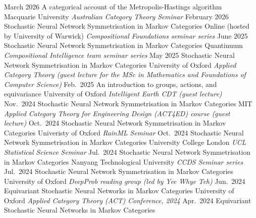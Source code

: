 \documentclass[9pt]{developercv} %
\begin{document}

\begin{entrylist}
    
\end{entrylist}


\begin{entrylist}
    \entry
        {March 2026}
        {A categorical account of the Metropolis-Hastings algorithm}
        {Macquarie University}
        {\textit{Australian Category Theory Seminar}}
    \entry
        {February 2026}
        {Stochastic Neural Network Symmetrisation in Markov Categories}
        {Online (hosted by University of Warwick)}
        {\textit{Compositional Foundations seminar series}}
    \entry
        {June 2025}
        {Stochastic Neural Network Symmetrisation in Markov Categories}
        {Quantinuum}
        {\textit{Compositional Intelligence team seminar series}}
    \entry
        {May 2025}
        {Stochastic Neural Network Symmetrisation in Markov Categories}
        {University of Oxford}
        {\textit{Applied Category Theory (guest lecture for the MSc in Mathematics and Foundations of Computer Science)}}
    \entry
        {Feb.\ 2025}
        {An introduction to groups, actions, and equivariance}
        {University of Oxford}
        {\textit{Intelligent Earth CDT (guest lecture)}}
    \entry
        {Nov.\ 2024}
        {Stochastic Neural Network Symmetrisation in Markov Categories}
        {MIT}
        {\textit{Applied Category Theory for Engineering Design (ACT4ED) course (guest lecture)}}
    \entry
        {Oct.\ 2024}
        {Stochastic Neural Network Symmetrisation in Markov Categories}
        {Univeristy of Oxford}
        {\textit{RainML Seminar}}
    \entry
        {Oct.\ 2024}
        {Stochastic Neural Network Symmetrisation in Markov Categories}
        {University College London}
        {\textit{UCL Statistical Science Seminar}}
    \entry
        {Jul.\ 2024}
        {Stochastic Neural Network Symmetrisation in Markov Categories}
        {Nanyang Technological University}
        {\textit{CCDS Seminar series}}
    \entry
        {Jul.\ 2024}
        {Stochastic Neural Network Symmetrisation in Markov Categories}
        {University of Oxford}
        {\textit{DeepProb reading group (led by Yee Whye Teh)}}
    \entry
        {Jun.\ 2024}
        {Equivariant Stochastic Neural Networks in Markov Categories}
        {University of Oxford}
        {\textit{Applied Category Theory (ACT) Conference, 2024}}
    \entry
        {Apr.\ 2024}
        {Equivariant Stochastic Neural Networks in Markov Categories}

\end{entrylist}
\end{document}
